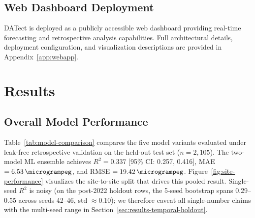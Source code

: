 \documentclass[toxins,article,submit,moreauthors]{Definitions/mdpi}
\begin{document}
\subsection{Web Dashboard Deployment}

DATect is deployed as a publicly accessible web dashboard providing real-time forecasting and retrospective analysis capabilities. Full architectural details, deployment configuration, and visualization descriptions are provided in Appendix~\ref{app:webapp}.


\section{Results}
\label{sec:results}

\subsection{Overall Model Performance}
\label{sec:results-overall}

Table~\ref{tab:model-comparison} compares the five model variants evaluated under leak-free retrospective validation on the held-out test set ($n = 2{,}105$). The two-model ML ensemble achieves $R^2 = 0.337$ [95\% CI: 0.257, 0.416], MAE $= \SI{6.53}{\microgrampeg}$, and RMSE $= \SI{19.42}{\microgrampeg}$. Figure~\ref{fig:site-performance} visualizes the site-to-site split that drives this pooled result. Single-seed $R^2$ is noisy (on the post-2022 holdout rows, the 5-seed bootstrap spans 0.29--0.55 across seeds 42--46, std $\approx 0.10$); we therefore caveat all single-number claims with the multi-seed range in Section~\ref{sec:results-temporal-holdout}.
\end{document}
